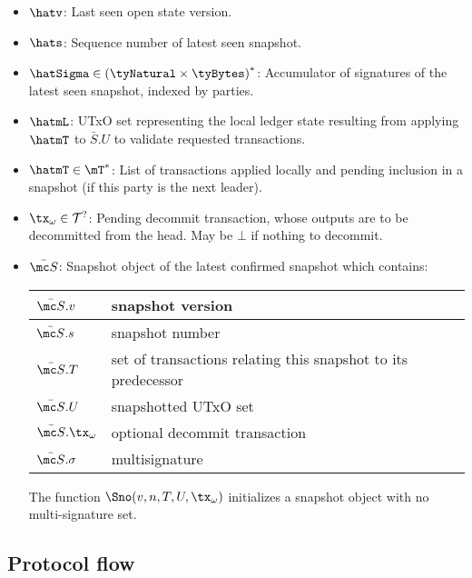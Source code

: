\begin{itemize}
	\item $\hatv$: Last seen open state version.
	\item $\hats$: Sequence number of latest seen snapshot.
	\item $\hatSigma \in {(\tyNatural \times \tyBytes)}^{*}$: Accumulator of
	      signatures of the latest seen snapshot, indexed by parties.
	\item $\hatmL$: UTxO set representing the local ledger state resulting from
	      applying $\hatmT$ to $\bar{S}.U$ to validate requested transactions.
	\item $\hatmT \in \mT^{*}$: List of transactions applied locally and pending
	      inclusion in a snapshot (if this party is the next leader).
	\item $\tx_{\omega} \in \mathcal{T}^{?}$: Pending decommit transaction, whose outputs are to be decommitted from the head. May be $\bot$ if nothing to decommit.
	\item $\bar{\mc S}$: Snapshot object of the latest confirmed snapshot which contains:
	      \begin{center}
		      \begin{tabular}{|l|l|}\hline
			      $\bar{\mc S}.v$            & snapshot version                                              \\ \hline
			      $\bar{\mc S}.s$            & snapshot number                                               \\ \hline
			      $\bar{\mc S}.T$            & set of transactions relating this snapshot to its predecessor \\ \hline
			      $\bar{\mc S}.U$            & snapshotted UTxO set                                          \\ \hline
			      $\bar{\mc S}.\tx_{\omega}$ & optional decommit transaction                                 \\ \hline
			      $\bar{\mc S}.\sigma$       & multisignature                                                \\ \hline
		      \end{tabular}
	      \end{center}
	      The function $\Sno(v,n,T,U,\tx_{\omega})$ initializes a snapshot object with no multi-signature set.
\end{itemize}

\subsection{Protocol flow}

